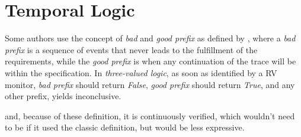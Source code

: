 \section{Temporal Logic}\label{sec:tl}

Some authors use the concept of \textit{bad} and \textit{good prefix} as defined by \textcite{kupferman_model_2001}, where a \textit{bad prefix} is a sequence of events that never leads to the fulfillment of the requirements, while the \textit{good prefix} is when any continuation of the trace will be within the specification. %
In \textit{three-valued logic}, as soon as identified by a \gls{RV} monitor, \textit{bad prefix} should return \textit{False}, \textit{good prefix} should return \textit{True}, and any other prefix, yields inconclusive.\cite{bauer_runtime_2011} %


and, because of these definition, it is continuously verified, which wouldn't need to be if it used the classic definition, but would be less expressive. %


